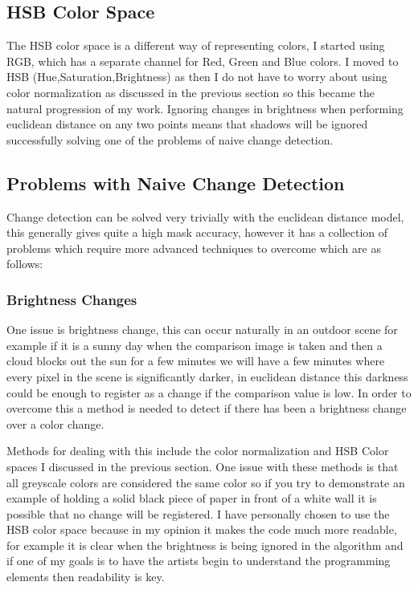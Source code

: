 \documentclass[a4paper]{report}
\begin{document}
\subsection{HSB Color Space}
The HSB color space is a different way of representing colors, I started using RGB, which has a separate channel for Red, Green and Blue colors. I moved to HSB (Hue,Saturation,Brightness) as then I do not have to worry about using color normalization as discussed in the previous section so this became the natural progression of my work. Ignoring changes in brightness when performing euclidean distance on any two points means that shadows will be ignored successfully solving one of the problems of naive change detection.

\subsection{Problems with Naive Change Detection}
Change detection can be solved very trivially with the euclidean distance model, this generally gives quite a high mask accuracy, however it has a collection of problems which require more advanced techniques to overcome which are as follows:

\subsubsection{Brightness Changes}
One issue is brightness change, this can occur naturally in an outdoor scene for example if it is a sunny day when the comparison image is taken and then a cloud blocks out the sun for a few minutes we will have a few minutes where every pixel in the scene is significantly darker, in euclidean distance this darkness could be enough to register as a change if the comparison value is low. In order to overcome this a method is needed to detect if there has been a brightness change over a color change.

Methods for dealing with this include the color normalization and HSB Color spaces I discussed in the previous section. One issue with these methods is that all greyscale colors are considered the same color so if you try to demonstrate an example of holding a solid black piece of paper in front of a white wall it is possible that no change will be registered. I have personally chosen to use the HSB color space because in my opinion it makes the code much more readable, for example it is clear when the brightness is being ignored in the algorithm and if one of my goals is to have the artists begin to understand the programming elements then readability is key.
\end{document}

